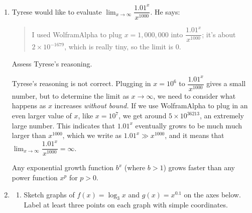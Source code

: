 \documentclass{article}
\begin{document}
\begin{enumerate}[resume]
\item 


  \begin{problem}[1in]
    Tyrese would like to evaluate $\displaystyle \lim_{x \to \infty} \dfrac{1.01^x}{x^{1000}}$. He says:
    \begin{quote}
      I used WolframAlpha to plug $x = 1,000,000$ into $\dfrac{1.01^x}{x^{1000}}$; it's about $2 \times 10^{-1679}$, which is really tiny, so the limit is 0. 
    \end{quote}
    Assess Tyrese's reasoning. 
  \end{problem}

    \begin{solution}
      Tyrese's reasoning is not correct. Plugging in $x=10^6$
      to $\dfrac{1.01^x}{x^{1000}}$ gives a small number, but to determine
      the limit as $x\to\infty$, we need to consider what happens
      as $x$ increases \emph{without bound.} If we use WolframAlpha
      to plug in an even
      larger value of $x$, like $x=10^7$, we get around $5 \times 
      10^{36213}$, an extremely large number.
      This indicates that $1.01^x$ eventually grows to be
      much much larger than $x^{1000}$, which we write as
      $1.01^x \gg x^{1000}$, and it means that 
      $\displaystyle \lim_{x \to \infty} \dfrac{1.01^x}{x^{1000}}=\infty$.

      Any exponential growth function $b^x$ (where $b>1$)
      grows faster
      than any power function $x^p$ for $p>0$.
      \end{solution}



\item 

  \begin{enumerate}
  \item
    \begin{problem}
      Sketch graphs of $f(x) = \log_3 x$ and $g(x) = x^{0.1}$ on the axes below. Label at least three points on each graph with simple coordinates.
    \end{problem}


\end{enumerate}
\end{enumerate}
\end{document}

